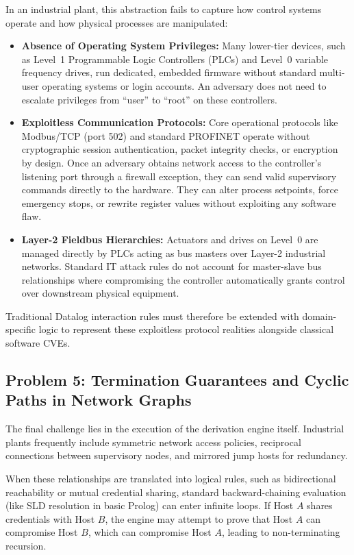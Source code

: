 \documentclass[target=mst,aauheader=aics,style=]{thud}
\begin{document}
In an industrial plant, this abstraction fails to capture how control systems operate and how physical processes are manipulated:
\begin{itemize}
    \item \textbf{Absence of Operating System Privileges:} Many lower-tier devices, such as Level~1 Programmable Logic Controllers (PLCs) and Level~0 variable frequency drives, run dedicated, embedded firmware without standard multi-user operating systems or login accounts. An adversary does not need to escalate privileges from ``user'' to ``root'' on these controllers.
    \item \textbf{Exploitless Communication Protocols:} Core operational protocols like Modbus/TCP (port 502) and standard PROFINET operate without cryptographic session authentication, packet integrity checks, or encryption by design. Once an adversary obtains network access to the controller's listening port through a firewall exception, they can send valid supervisory commands directly to the hardware. They can alter process setpoints, force emergency stops, or rewrite register values without exploiting any software flaw.
    \item \textbf{Layer-2 Fieldbus Hierarchies:} Actuators and drives on Level~0 are managed directly by PLCs acting as bus masters over Layer-2 industrial networks. Standard IT attack rules do not account for master-slave bus relationships where compromising the controller automatically grants control over downstream physical equipment.
\end{itemize}
Traditional Datalog interaction rules must therefore be extended with domain-specific logic to represent these exploitless protocol realities alongside classical software CVEs.

\subsection{Problem 5: Termination Guarantees and Cyclic Paths in Network Graphs}
The final challenge lies in the execution of the derivation engine itself. Industrial plants frequently include symmetric network access policies, reciprocal connections between supervisory nodes, and mirrored jump hosts for redundancy.

When these relationships are translated into logical rules, such as bidirectional reachability or mutual credential sharing, standard backward-chaining evaluation (like SLD resolution in basic Prolog) can enter infinite loops. If Host $A$ shares credentials with Host $B$, the engine may attempt to prove that Host $A$ can compromise Host $B$, which can compromise Host $A$, leading to non-terminating recursion. 
\end{document}
